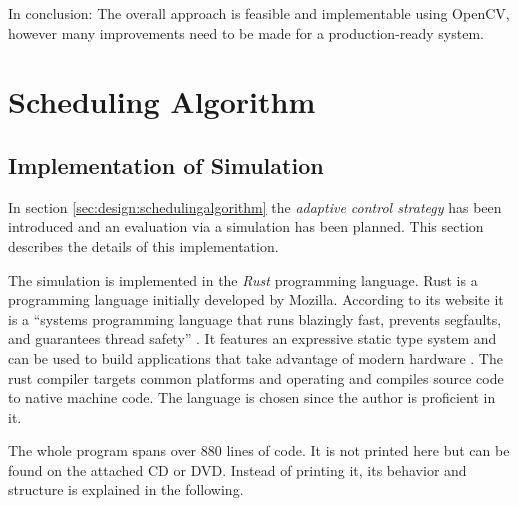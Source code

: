 In conclusion: The overall approach is feasible and implementable using OpenCV, however many improvements need to be made for a production-ready system.


\section{Scheduling Algorithm}
\subsection{Implementation of Simulation}
In section \ref{sec:design:schedulingalgorithm} the \emph{adaptive control strategy} has been introduced and an evaluation via a simulation has been planned.
This section describes the details of this implementation.

The simulation is implemented in the \emph{Rust} programming language.
Rust is a programming language initially developed by Mozilla.
According to its website it is a \enquote{systems programming language that runs blazingly fast, prevents segfaults, and guarantees thread safety} \autocite{rust2018rust}.
It features an expressive static type system and can be used to build applications that take advantage of modern hardware
\autocite[][]{matsakis2014rust}.
The rust compiler targets common platforms and operating and compiles source code to native machine code.
The language is chosen since the author is proficient in it.

The whole program spans over 880 lines of code.
It is not printed here but can be found on the attached CD or DVD.
Instead of printing it, its behavior and structure is explained in the following.

